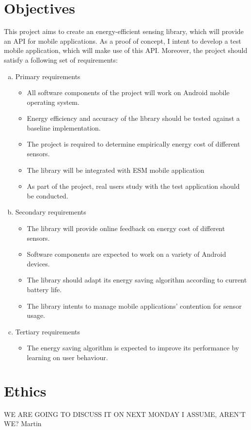 \documentclass[a4page]{article}
\begin{document}
\section{Objectives}
This project aims to create an energy-efficient sensing library, which will provide an API for mobile applications. As a proof of concept, I intent to develop a test mobile application, which will make use of this API. Moreover, the project should satisfy a following set of requirements:
\begin{enumerate}[(a)]
  \item Primary requirements
  \begin{itemize}
  	\item All software components of the project will work on Android mobile operating system.
    \item Energy efficiency and accuracy of the library should be tested against a baseline implementation.
    \item The project is required to determine empirically energy cost of different sensors.
    \item The library will be integrated with ESM mobile application
    \item As part of the project, real users study with the test application should be conducted. 
  \end{itemize}
  \item Secondary requirements
  \begin{itemize}
	\item The library will provide online feedback on energy cost of different sensors.
  	\item Software components are expected to work on a variety of Android devices.
    \item The library should adapt its energy saving algorithm according to current battery life.    
    \item The library intents to manage mobile applications' contention for sensor usage.  
  \end{itemize}
  \item Tertiary requirements
  \begin{itemize}
  	\item The energy saving algorithm is expected to improve its performance by learning on user behaviour. 
  \end{itemize}
\end{enumerate}

\section{Ethics}
	WE ARE GOING TO DISCUSS IT ON NEXT MONDAY I ASSUME, AREN'T WE? Martin
    
\end{document}
